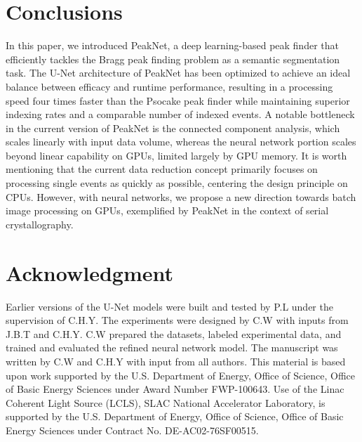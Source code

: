 \documentclass[conference]{IEEEtran}
\newcommand{\peaknet}{PeakNet}
\newcommand{\psocake}{Psocake}
\begin{document}

\section{Conclusions}

In this paper, we introduced \peaknet{}, a deep learning-based peak finder that
efficiently tackles the Bragg peak finding problem as a semantic segmentation
task. The U-Net architecture of \peaknet{} has been optimized to achieve an
ideal balance between efficacy and runtime performance, resulting in a
processing speed four times faster than the \psocake{} peak finder while
maintaining superior indexing rates and a comparable number of indexed events. A
notable bottleneck in the current version of \peaknet{} is the connected
component analysis, which scales linearly with input data volume, whereas the
neural network portion scales beyond linear capability on GPUs, limited largely
by GPU memory. It is worth mentioning that the current data reduction concept
primarily focuses on processing single events as quickly as possible, centering
the design principle on CPUs. However, with neural networks, we propose a new
direction towards batch image processing on GPUs, exemplified by \peaknet{} in
the context of serial crystallography.


\section*{Acknowledgment}

Earlier versions of the U-Net
models were built and tested by P.L under the supervision of C.H.Y.  The experiments were
designed by C.W with inputs from J.B.T and C.H.Y.  C.W prepared the datasets, labeled
experimental data, and trained and evaluated the refined neural network model.
The manuscript was written by C.W and C.H.Y with input from all authors.  This
material is based upon work supported by the U.S.  Department of Energy, Office
of Science, Office of Basic Energy Sciences under Award Number FWP-100643.  Use
of the Linac Coherent Light Source (LCLS), SLAC National Accelerator Laboratory,
is supported by the U.S. Department of Energy, Office of Science, Office of
Basic Energy Sciences under Contract No.  DE-AC02-76SF00515.



\end{document}
